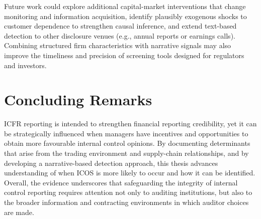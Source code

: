 \documentclass[12pt, a4paper]{report}
\begin{document}
Future work could explore additional capital-market interventions that change monitoring and information acquisition, identify plausibly exogenous shocks to customer dependence to strengthen causal inference, and extend text-based detection to other disclosure venues (e.g., annual reports or earnings calls). Combining structured firm characteristics with narrative signals may also improve the timeliness and precision of screening tools designed for regulators and investors.

\section{Concluding Remarks}

ICFR reporting is intended to strengthen financial reporting credibility, yet it can be strategically influenced when managers have incentives and opportunities to obtain more favourable internal control opinions. By documenting determinants that arise from the trading environment and supply-chain relationships, and by developing a narrative-based detection approach, this thesis advances understanding of when ICOS is more likely to occur and how it can be identified. Overall, the evidence underscores that safeguarding the integrity of internal control reporting requires attention not only to auditing institutions, but also to the broader information and contracting environments in which auditor choices are made.



\end{document}
